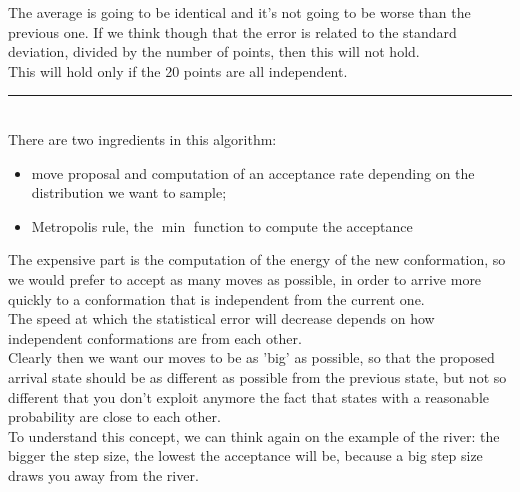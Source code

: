The average is going to be identical and it's not going to be worse than the previous one. If we think though that the error is related to the standard deviation, divided by the number of points, then this will not hold.\\
This will hold only if the 20 points are all independent.\\
\noindent\rule{8cm}{0.4pt}\\
There are two ingredients in this algorithm:
\begin{itemize}
\item move proposal and computation of an acceptance rate depending on the distribution we want to sample;
\item Metropolis rule, the $\min$ function to compute the acceptance
\end{itemize}
The expensive part is the computation of the energy of the new conformation, so we would prefer to accept as many moves as possible, in order to arrive more quickly to a conformation that is independent from the current one.\\
The speed at which the statistical error will decrease depends on how independent conformations are from each other.\\
Clearly then we want our moves to be as 'big' as possible, so that the proposed arrival state should be as different as possible from the previous state, but not so different that you don't exploit anymore the fact that states with a reasonable probability are close to each other.\\
To understand this concept, we can think again on the example of the river: the bigger the step size, the lowest the acceptance will be, because a big step size draws you away from the river.\\

